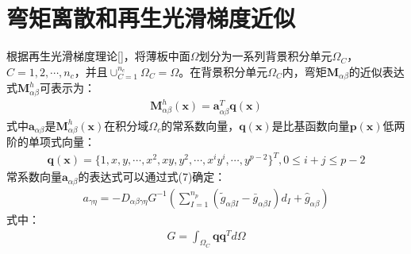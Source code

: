 \documentclass[a4paper]{article}
\begin{document}
\section{弯矩离散和再生光滑梯度近似}
根据再生光滑梯度理论[]，将薄板中面$\Omega$划分为一系列背景积分单元$\Omega_C$，$C=1,2,\dotsb,n_c$，并且$\cup_{C=1}^{n_c}\Omega_C=\Omega$。在背景积分单元$\Omega_C$内，弯矩$\pmb{M}_{\alpha\beta}$的近似表达式$\pmb{M}^h_{\alpha\beta}$可表示为：
\begin{equation}
\begin{split}
    \pmb M_{\alpha\beta}^h(\pmb{x})=\pmb{a}^T_{\alpha\beta}\pmb{q}(\pmb{x})
\end{split}
\end{equation}
式中$\pmb a_{\alpha\beta}$是$\pmb M_{\alpha\beta}^h(\pmb{x})$在积分域$\Omega_c$的常系数向量，$\pmb{q}(\pmb{x})$是比基函数向量$\pmb{p}(\pmb{x})$低两阶的单项式向量：
\begin{equation}
\begin{split}
    \pmb{q}(\pmb{x})=\{1,x,y,\dotsb,x^2,xy,y^2,\dotsb,x^iy^i,\dotsb,y^{p-2}\}^T,0\le i+j\le p-2
\end{split}
\end{equation}
常系数向量$\pmb{a}_{\alpha\beta}$的表达式可以通过式(7)确定：
\begin{equation}
\begin{split}
    a_{\gamma\eta}=-D_{\alpha\beta\gamma\eta}G^{-1}(\sum_{I=1}^{n_p}(\tilde{g}_{\alpha\beta I}-\bar{g}_{\alpha\beta I})d_I+\hat{g}_{\alpha\beta})
\end{split}
\end{equation}
式中：
\begin{equation}
\begin{split}
    G=\int_{\Omega_C}\pmb{q}\pmb{q}^Td\Omega
\end{split}
\end{equation}
\end{document}
